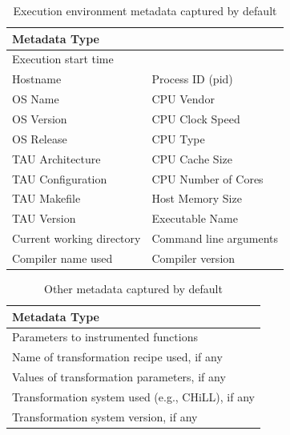 \documentclass[msthesis,justified,copyright,final,numbers,sort&compress,
gsmodern,amstex,natbib]{uothesis}
\begin{document}
\begin{table}[btp]
\begin{center}
\begin{tabular}{ l | l}
\hline
Metadata Type \\
\hline
Execution start time \\
Hostname & Process ID (pid) \\
OS Name & CPU Vendor \\
OS Version & CPU Clock Speed \\
OS Release & CPU Type \\
TAU Architecture & CPU Cache Size\\
TAU Configuration & CPU Number of Cores\\
TAU Makefile & Host Memory Size\\
TAU Version & Executable Name\\
Current working directory & Command line arguments \\
Compiler name used & Compiler version \\
\hline
\end{tabular}
\end{center}
\caption{Execution environment metadata captured by default}
\label{tab:metadata}
\end{table}

\begin{table}[btp]
\begin{center}
\begin{tabular}{ l }
\hline
Metadata Type \\
\hline
Parameters to instrumented functions \\
Name of transformation recipe used, if any \\
Values of transformation parameters, if any \\
Transformation system used (e.g., CHiLL), if any \\
Transformation system version, if any \\
\hline
\end{tabular}
\end{center}
\caption{Other metadata captured by default}
\label{tab:userdata}
\end{table}
\end{document}

